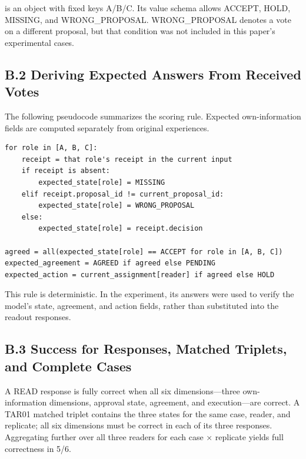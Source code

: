 \documentclass[10pt,a4paper]{article}
\begin{document}
\texttt{} is an object with fixed keys A/B/C. Its value schema allows ACCEPT, HOLD, MISSING, and WRONG\_PROPOSAL. WRONG\_PROPOSAL denotes a vote on a different proposal, but that condition was not included in this paper's experimental cases.

\subsection{B.2 Deriving Expected Answers From Received Votes}\label{paper-04-b.2-deriving-expected-answers-from-received-votes}

The following pseudocode summarizes the scoring rule. Expected own-information fields are computed separately from original experiences.

\noindent\begin{minipage}{\linewidth}
\begin{verbatim}
for role in [A, B, C]:
    receipt = that role's receipt in the current input
    if receipt is absent:
        expected_state[role] = MISSING
    elif receipt.proposal_id != current_proposal_id:
        expected_state[role] = WRONG_PROPOSAL
    else:
        expected_state[role] = receipt.decision

agreed = all(expected_state[role] == ACCEPT for role in [A, B, C])
expected_agreement = AGREED if agreed else PENDING
expected_action = current_assignment[reader] if agreed else HOLD
\end{verbatim}
\end{minipage}\par

This rule is deterministic. In the experiment, its answers were used to verify the model's state, agreement, and action fields, rather than substituted into the readout responses.

\subsection{B.3 Success for Responses, Matched Triplets, and Complete Cases}\label{paper-04-b.3-success-for-responses-matched-triplets-and-complete-cases}

A READ response is fully correct when all six dimensions---three own-information dimensions, approval state, agreement, and execution---are correct. A TAR01 matched triplet contains the three states for the same case, reader, and replicate; all six dimensions must be correct in each of its three responses. Aggregating further over all three readers for each case × replicate yields full correctness in 5/6.
\end{document}
